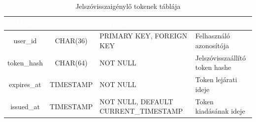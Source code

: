 \documentclass[12pt]{report}
\begin{document}
\begin{table}[h!]
    \centering
    \renewcommand{\arraystretch}{1.5}  %
    \begin{tabularx}{\textwidth}{|c|c|>{\raggedright\arraybackslash}X|>{\raggedright\arraybackslash}X|}  %
        \hline
        \rowcolor{gray!30} \textcolor{white}{\textbf{Mező}} & \textcolor{white}{\textbf{Típus}} & \textcolor{white}{\textbf{Korlátok}} & \textcolor{white}{\textbf{Leírás}} \\
        \hline
        user\_id & CHAR(36) & PRIMARY KEY, FOREIGN KEY & Felhasználó azonosítója \\
        \hline
        token\_hash & CHAR(64) & NOT NULL & Jelszóvisszaállító token hashe \\
        \hline
        expires\_at & TIMESTAMP & NOT NULL & Token lejárati ideje \\
        \hline
        issued\_at & TIMESTAMP & NOT NULL, DEFAULT CURRENT\_TIMESTAMP & Token kiadásának ideje \\
        \hline
    \end{tabularx}
    \caption{Jelszóvisszaigénylő tokenek táblája}
    \label{tab:password_resets}
\end{table}
\end{document}
